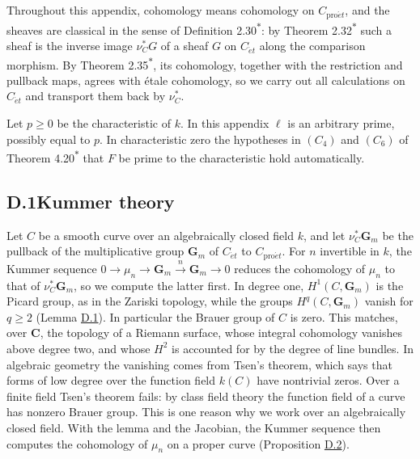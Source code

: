 \documentclass[11pt]{article}
\newcommand{\bpout}[1]{#1\textsuperscript{\hyperlink{bp-outside}{\ensuremath{\ast}}}}
\begin{document}
Throughout this appendix, cohomology means cohomology on \(C_{\mathrm{pro}\acute{e}t}\), and the sheaves are classical in the sense of Definition \bpout{2.30}: by Theorem \bpout{2.32} such a sheaf is the inverse image \(\nu_C^*G\) of a sheaf \(G\) on \(C_{\acute{e}t}\) along the comparison morphism. By Theorem \bpout{2.35}, its cohomology, together with the restriction and pullback maps, agrees with étale cohomology, so we carry out all calculations on \(C_{\acute{e}t}\) and transport them back by \(\nu_C^*\).

Let \(p\ge0\) be the characteristic of \(k\). In this appendix \(\ell\) is an arbitrary prime, possibly equal to \(p\). In characteristic zero the hypotheses in \((C_4)\) and \((C_6)\) of Theorem \bpout{4.20} that \(F\) be prime to the characteristic hold automatically.

\subsection*{\texorpdfstring{D.1\quad Kummer theory}{D.1 Kummer theory}}
\label{bp174}%
\label{bp175}%
Let \(C\) be a smooth curve over an algebraically closed field \(k\), and let \(\nu_C^*\mathbf G_m\) be the pullback of the multiplicative group \(\mathbf G_m\) of \(C_{\acute{e}t}\) to \(C_{\mathrm{pro}\acute{e}t}\). For \(n\) invertible in \(k\), the Kummer sequence \(0\to\mu_n\to\mathbf G_m\xrightarrow{n}\mathbf G_m\to0\) reduces the cohomology of \(\mu_n\) to that of \(\nu_C^*\mathbf G_m\), so we compute the latter first. In degree one, \(H^1(C,\mathbf G_m)\) is the Picard group, as in the Zariski topology, while the groups \(H^q(C,\mathbf G_m)\) vanish for \(q\ge2\) (Lemma \hyperref[bp176]{D.1}). In particular the Brauer group of \(C\) is zero. This matches, over \(\mathbf C\), the topology of a Riemann surface, whose integral cohomology vanishes above degree two, and whose \(H^2\) is accounted for by the degree of line bundles. In algebraic geometry the vanishing comes from Tsen's theorem, which says that forms of low degree over the function field \(k(C)\) have nontrivial zeros. Over a finite field Tsen's theorem fails: by class field theory the function field of a curve has nonzero Brauer group. This is one reason why we work over an algebraically closed field. With the lemma and the Jacobian, the Kummer sequence then computes the cohomology of \(\mu_n\) on a proper curve (Proposition \hyperref[bp179]{D.2}).
\end{document}
